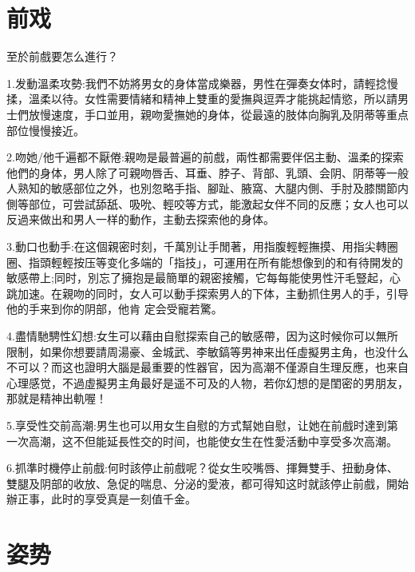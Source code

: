 \documentclass[12pt,UTF8]{ctexbook}
\begin{document}
\chapter{前戏}

至於前戲要怎么進行？

1.发動溫柔攻勢:我們不妨將男女的身体當成樂器，男性在彈奏女体时，請輕捻慢揉，溫柔以待。女性需要情緒和精神上雙重的愛撫與逗弄才能挑起情慾，所以請男士們放慢速度，手口並用，親吻愛撫她的身体，從最遠的肢体向胸乳及阴蒂等重点部位慢慢接近。

2.吻她/他千遍都不厭倦:親吻是最普遍的前戲，兩性都需要伴侶主動、溫柔的探索他們的身体，男人除了可親吻唇舌、耳垂、脖子、背部、乳頭、会阴、阴蒂等一般人熟知的敏感部位之外，也別忽略手指、腳趾、腋窩、大腿内側、手肘及膝關節内側等部位，可尝試舔舐、吸吮、輕咬等方式，能激起女伴不同的反應；女人也可以反過来做出和男人一样的動作，主動去探索他的身体。

3.動口也動手:在这個親密时刻，千萬別让手閒著，用指腹輕輕撫摸、用指尖轉圈圈、指頭輕輕按压等变化多端的「指技」，可運用在所有能想像到的和有待開发的敏感帶上;同时，別忘了擁抱是最簡單的親密接觸，它每每能使男性汗毛豎起，心跳加速。在親吻的同时，女人可以動手探索男人的下体，主動抓住男人的手，引导他的手来到你的阴部，他肯
定会受寵若驚。

4.盡情馳騁性幻想:女生可以藉由自慰探索自己的敏感帶，因为这时候你可以無所限制，如果你想要請周湯豪、金城武、李敏鎬等男神来出任虛擬男主角，也没什么不可以？而这也證明大腦是最重要的性器官，因为高潮不僅源自生理反應，也来自心理感觉，不過虛擬男主角最好是遥不可及的人物，若你幻想的是閨密的男朋友，那就是精神出軌喔！

5.享受性交前高潮:男生也可以用女生自慰的方式幫她自慰，让她在前戲时達到第一次高潮，这不但能延長性交的时间，也能使女生在性愛活動中享受多次高潮。

6.抓準时機停止前戲:何时該停止前戲呢？從女生咬嘴唇、揮舞雙手、扭動身体、雙腿及阴部的收放、急促的喘息、分泌的愛液，都可得知这时就該停止前戲，開始辦正事，此时的享受真是一刻值千金。

\chapter{姿势}
\end{document}
